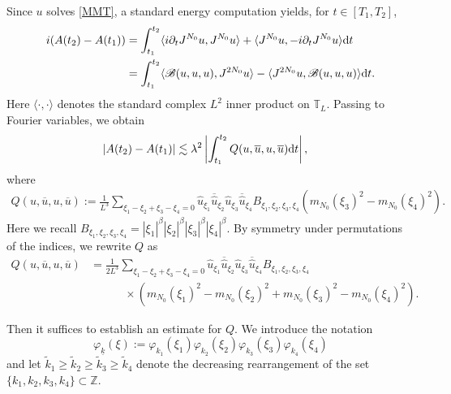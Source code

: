 \documentclass[UTF-8,reqno]{amsart}
\numberwithin{equation}{section}
\theoremstyle{definition}
\def\dif{{\mathord{{\rm d}}}}
\def\ge{\geqslant}
\def\dif{{\mathord{{\rm d}}}}
\def\ge{\geqslant}
\begin{document}
Since $u$ solves \eqref{MMT}, a standard energy computation yields, for $t\in[T_1,T_2]$,
\begin{align*}
   i( A(t_2)-A(t_1))&=\int_{t_1}^{t_2}\langle i\partial_tJ^{N_0}u,J^{N_0}u\rangle+\langle J^{N_0}u, -i\partial_tJ^{N_0} u\rangle\dif t\\
    &=\int_{t_1}^{t_2} \langle \mathscr{B}(u,u,u),J^{2N_0}{u} \rangle- \langle J^{2N_0}u,\mathscr{B}({u},{u},u) \rangle\dif t.
\end{align*}
Here $\langle\cdot,\cdot\rangle$ denotes the standard complex $L^2$ inner product on $\mathbb{T}_L$. Passing to Fourier variables, we obtain
\begin{align*}
  |   A(t_2)-A(t_1)|&\lesssim\lambda^2\left|\int_{t_1}^{t_2} Q(u,\overline u,u,\overline u)\dif t\right|,
\end{align*}
where \begin{align*}
Q(u,\overline u,u,\overline u):=\frac{1}{L^{3}}\sum_{\xi_1-\xi_2+\xi_3-\xi_4=0}\widehat{u}_{\xi_1}\overline{\widehat{u}}_{\xi_2}\widehat{u}_{\xi_3}\overline{\widehat{u}}_{\xi_4}B_{\xi_1,\xi_2,\xi_3,\xi_4}(m_{N_0}(\xi_3)^2-m_{N_0}(\xi_4)^2).
\end{align*}
Here we recall  $B_{\xi_1,\xi_2,\xi_3,\xi_4}=|\xi_1|^\beta|\xi_2|^\beta|\xi_3|^\beta|\xi_4|^\beta.$ By symmetry under permutations of the indices, we rewrite $Q$ as
 \begin{align*}
Q(u,\overline u,u,\overline u)&=\frac{1}{2L^{3}}\sum_{\xi_1-\xi_2+\xi_3-\xi_4=0}\widehat{u}_{\xi_1}\overline{\widehat{u}}_{\xi_2}\widehat{u}_{\xi_3}\overline{\widehat{u}}_{\xi_4}B_{\xi_1,\xi_2,\xi_3,\xi_4}\\
&\quad\quad\quad\times(m_{N_0}(\xi_1)^2-m_{N_0}(\xi_2)^2+m_{N_0}(\xi_3)^2-m_{N_0}(\xi_4)^2).
\end{align*}

Then it suffices to establish an estimate for $Q$. 
We introduce the notation $$\varphi_{\underline{k}}(\xi):=\varphi_{k_1}(\xi_1)\varphi_{k_2}(\xi_2)\varphi_{k_3}(\xi_3)\varphi_{k_4}(\xi_4)$$ and let $\tilde{k}_1 \ge \tilde{k}_2 \ge \tilde{k}_3 \ge \tilde{k}_4$ 
denote the decreasing rearrangement of the set 
$\{k_1,k_2,k_3,k_4\} \subset \mathbb{Z}$.
\end{document}
